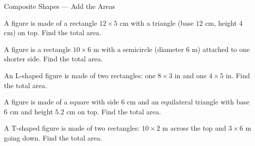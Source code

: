 \begin{practiceBox}{Composite Shapes — Add the Areas}


\prob A figure is made of a rectangle $12 \times 5$ cm with a triangle (base $12$ cm, height $4$ cm) on top. Find the total area. \answerBlank[3cm]

\prob A figure is a rectangle $10 \times 6$ m with a semicircle (diameter $6$ m) attached to one shorter side. Find the total area. \answerBlank[3cm]

\prob An L-shaped figure is made of two rectangles: one $8 \times 3$ in and one $4 \times 5$ in. Find the total area. \answerBlank[3cm]

\prob A figure is made of a square with side $6$ cm and an equilateral triangle with base $6$ cm and height $5.2$ cm on top. Find the total area. \answerBlank[3cm]

\prob A T-shaped figure is made of two rectangles: $10 \times 2$ m across the top and $3 \times 6$ m going down. Find the total area. \answerBlank[3cm]

\end{practiceBox}

